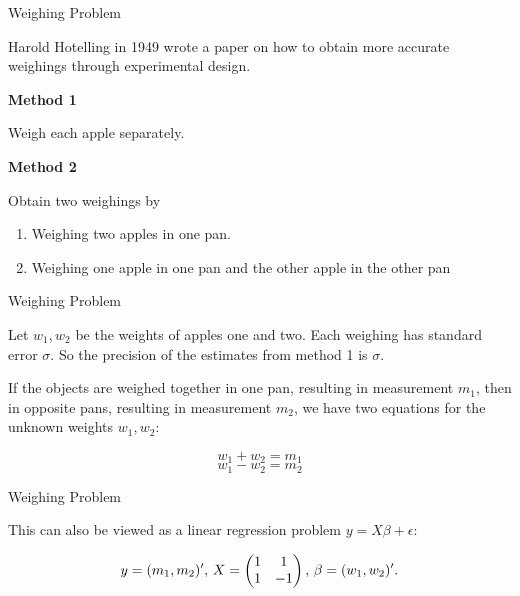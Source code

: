\documentclass[9pt,ignorenonframetext,]{beamer}
\providecommand{\tightlist}{%
\setlength{\itemsep}{0pt}\setlength{\parskip}{0pt}}
\begin{document}
\begin{frame}{Weighing Problem}

Harold Hotelling in 1949 wrote a paper on how to obtain more accurate
weighings through experimental design.

\textbf{Method 1}

Weigh each apple separately.

\textbf{Method 2}

Obtain two weighings by

\begin{enumerate}
\def\labelenumi{\arabic{enumi}.}
\tightlist
\item
  Weighing two apples in one pan.
\item
  Weighing one apple in one pan and the other apple in the other pan
\end{enumerate}

\end{frame}

\begin{frame}{Weighing Problem}

Let \(w_1, w_2\) be the weights of apples one and two. Each weighing has
standard error \(\sigma\). So the precision of the estimates from method
1 is \(\sigma\).

If the objects are weighed together in one pan, resulting in measurement
\(m_1\), then in opposite pans, resulting in measurement \(m_2\), we
have two equations for the unknown weights \(w_1,w_2\):

\[w_1+w_2 =  m_1\] \[w_1-w_2 =  m_2\]

\end{frame}

\begin{frame}{Weighing Problem}

This can also be viewed as a linear regression problem
\(y=X{\beta}+\epsilon\):

\[y=(m_1,m_2)^{\prime},\thinspace X=
 \begin{pmatrix}
  1 & 1 \\
  1 & -1 \\
 \end{pmatrix}, \thinspace {\beta}=(w_1,w_2)^{\prime}.\]

\end{frame}
\end{document}
